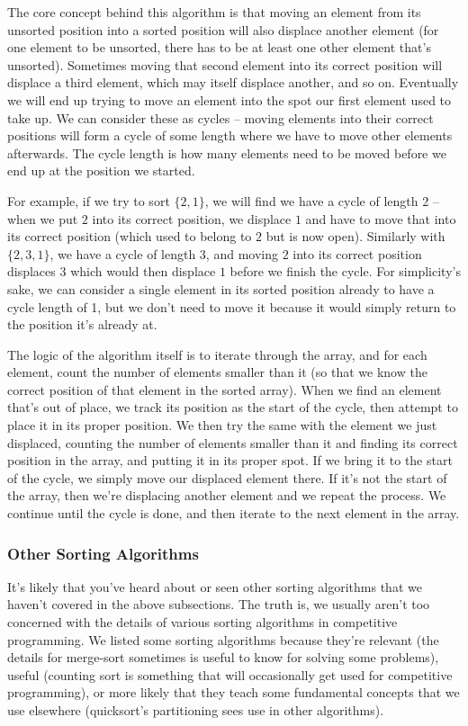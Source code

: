 The core concept behind this algorithm is that moving an element from its unsorted position into a sorted position will also displace another element (for one element to be unsorted, there has to be at least one other element that's unsorted). Sometimes moving that second element into its correct position will displace a third element, which may itself displace another, and so on. Eventually we will end up trying to move an element into the spot our first element used to take up. We can consider these as cycles -- moving elements into their correct positions will form a cycle of some length where we have to move other elements afterwards. The cycle length is how many elements need to be moved before we end up at the position we started.

For example, if we try to sort $\{2,1\}$, we will find we have a cycle of length 2 -- when we put $2$ into its correct position, we displace $1$ and have to move that into its correct position (which used to belong to $2$ but is now open). Similarly with $\{2,3,1\}$, we have a cycle of length 3, and moving $2$ into its correct position displaces $3$ which would then displace $1$ before we finish the cycle. For simplicity's sake, we can consider a single element in its sorted position already to have a cycle length of 1, but we don't need to move it because it would simply return to the position it's already at.

The logic of the algorithm itself is to iterate through the array, and for each element, count the number of elements smaller than it (so that we know the correct position of that element in the sorted array). When we find an element that's out of place, we track its position as the start of the cycle, then attempt to place it in its proper position. We then try the same with the element we just displaced, counting the number of elements smaller than it and finding its correct position in the array, and putting it in its proper spot. If we bring it to the start of the cycle, we simply move our displaced element there. If it's not the start of the array, then we're displacing another element and we repeat the process. We continue until the cycle is done, and then iterate to the next element in the array.

\subsubsection{Other Sorting Algorithms}

It's likely that you've heard about or seen other sorting algorithms that we haven't covered in the above subsections. The truth is, we usually aren't too concerned with the details of various sorting algorithms in competitive programming. We listed some sorting algorithms because they're relevant (the details for merge-sort sometimes is useful to know for solving some problems), useful (counting sort is something that will occasionally get used for competitive programming), or more likely that they teach some fundamental concepts that we use elsewhere (quicksort's partitioning sees use in other algorithms).

